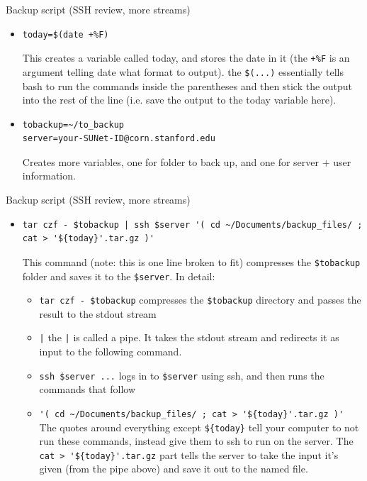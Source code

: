 \documentclass{beamer}
\begin{document}
\begin{frame}[fragile]{Backup script (SSH review, more streams)}
\begin{itemize}
\item
\begin{lstlisting}
today=$(date +%F)
\end{lstlisting}
This creates a variable called today, and stores the date in it (the \lstinline|+%F| is an argument telling date what format to output). the \lstinline|$(...)| essentially tells bash to run the commands inside the parentheses and then stick the output into the rest of the line (i.e. save the output to the today variable here). 
\item
\begin{lstlisting}
tobackup=~/to_backup
server=your-SUNet-ID@corn.stanford.edu
\end{lstlisting}
Creates more variables, one for folder to back up, and one for server + user information.
\end{itemize}
\end{frame}

\begin{frame}[fragile]{Backup script (SSH review, more streams)}
\begin{itemize}
\item
\begin{lstlisting}
tar czf - $tobackup | ssh $server '( cd ~/Documents/backup_files/ ; cat > '${today}'.tar.gz )'
\end{lstlisting}
This command (note: this is one line broken to fit) compresses the \lstinline|$tobackup| folder and saves it to the \lstinline|$server|. In detail: 
\begin{itemize}
    \item<1-> \lstinline|tar czf - $tobackup| compresses the \lstinline|$tobackup| directory and passes the result to the stdout stream
    \item<2-> \lstinline!|! the \lstinline!|! is called a pipe. It takes the stdout stream and redirects it as input to the following command. 
    \item<3-> \lstinline|ssh $server ...| logs in to \lstinline|$server| using ssh, and then runs the commands that follow
    \item<4-> \lstinline|'( cd ~/Documents/backup_files/ ; cat > '${today}'.tar.gz )'| The quotes around everything except \lstinline|${today}| tell your computer to not run these commands, instead give them to ssh to run on the server. The \lstinline|cat > '${today}'.tar.gz| part tells the server to take the input it's given (from the pipe above) and save it out to the named file.
\end{itemize}
\end{itemize}
\end{frame}
\end{document}
